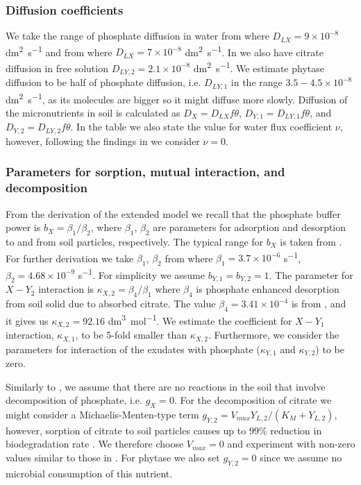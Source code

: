 \documentclass[11pt]{article}
\numberwithin{equation}{section}
\begin{document}
\subsubsection{Diffusion coefficients}
We take the range of phosphate diffusion in water from \cite{Ptashnyk-2010} where $D_{LX} = 9 \times 10^{-8}$ \si{dm^2 .s^{-1}} and from \cite{McKayFletcher-2019} where $D_{LX} = 7 \times 10^{-8}$ \si{dm^2.s^{-1}}. In \cite{McKayFletcher-2019} we also have citrate diffusion in free solution $D_{LY,2} = 2.1 \times 10^{-8}$ \si{dm^2.s^{-1}}. We estimate phytase diffusion to be half of phosphate diffusion, i.e. $D_{LY,1}$ in the range $3.5-4.5 \times 10^{-8}$ \si{dm^2.s^{-1}}, as its molecules are bigger so it might diffuse more slowly. Diffusion of the micronutrients in soil is calculated as $D_X = D_{LX} f \theta$, $D_{Y,1} = D_{LY,1} f \theta$, and $D_{Y,2} = D_{LY,2}f\theta$. In the table we also state the value for water flux coefficient $\nu$, however, following the findings in \cite{Ptashnyk-2011} we consider $\nu=0$. 

\subsubsection{Parameters for sorption, mutual interaction, and decomposition}
From the derivation of the extended model we recall that the phosphate buffer power is $b_X = \beta_1 / \beta_2$, where $\beta_1$, $\beta_2$ are parameters for adsorption and desorption to and from soil particles, respectively. The typical range for $b_X$ is taken from \cite{Ptashnyk-2010}. For further derivation we take $\beta_1$, $\beta_2$ from \cite{Ptashnyk-2010} where $\beta_1 = 3.7 \times 10^{-6}$ \si{s^{-1}}, $\beta_2 = 4.68 \times 10^{-9}$ \si{s^{-1}}. For simplicity we assume $b_{Y,1}=b_{Y,2} = 1$. The parameter for $X-Y_2$ interaction is $\kappa_{X,2} = \beta_4 / \beta_1$ where $\beta_4$ is phosphate enhanced desorption from soil solid due to absorbed citrate. The value $\beta_4 = 3.41 \times 10^{-4}$ is from \cite{McKayFletcher-2019}, and it gives us $\kappa_{X,2} = 92.16$ \si{dm^3. mol^{-1}}. We estimate the coefficient for $X-Y_1$ interaction, $\kappa_{X,1}$, to be 5-fold smaller than $\kappa_{X,2}$. Furthermore, we consider the parameters for interaction of the exudates with phosphate ($\kappa_{Y,1}$ and $\kappa_{Y,2}$) to be zero. 

Similarly to \cite{Ptashnyk-2011}, we assume that there are no reactions in the soil that involve decomposition of phosphate, i.e. $g_X = 0$. For the decomposition of citrate we might consider a Michaelis-Menten-type term $g_{Y,2} = V_{max} Y_{L,2} / (K_M + Y_{L,2})$, however, sorption of citrate to soil particles causes up to 99\% reduction in biodegradation rate \cite{McKayFletcher-2019}. We therefore choose $V_{max} = 0$ and experiment with non-zero values similar to those in \cite{Ptashnyk-2011}. For phytase we also set $g_{Y,2} = 0$ since we assume no microbial consumption of this nutrient.
\end{document}
